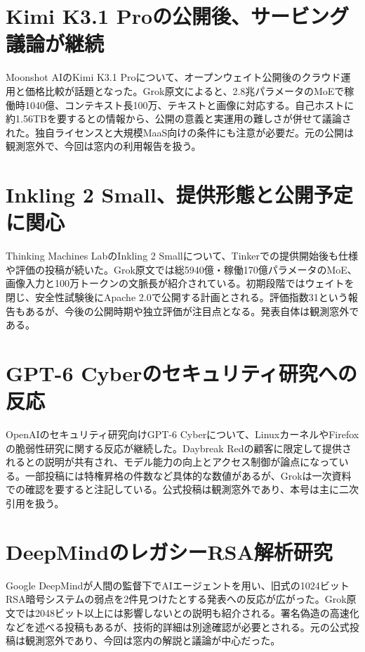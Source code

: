 \section{Kimi K3.1 Proの公開後、サービング議論が継続}
Moonshot AIのKimi K3.1 Proについて、オープンウェイト公開後のクラウド運用と価格比較が話題となった。Grok原文によると、2.8兆パラメータのMoEで稼働時1040億、コンテキスト長100万、テキストと画像に対応する。自己ホストに約1.56TBを要するとの情報から、公開の意義と実運用の難しさが併せて議論された。独自ライセンスと大規模MaaS向けの条件にも注意が必要だ。元の公開は観測窓外で、今回は窓内の利用報告を扱う。

\section{Inkling 2 Small、提供形態と公開予定に関心}
Thinking Machines LabのInkling 2 Smallについて、Tinkerでの提供開始後も仕様や評価の投稿が続いた。Grok原文では総5940億・稼働170億パラメータのMoE、画像入力と100万トークンの文脈長が紹介されている。初期段階ではウェイトを閉じ、安全性試験後にApache 2.0で公開する計画とされる。評価指数31という報告もあるが、今後の公開時期や独立評価が注目点となる。発表自体は観測窓外である。

\section{GPT-6 Cyberのセキュリティ研究への反応}
OpenAIのセキュリティ研究向けGPT-6 Cyberについて、LinuxカーネルやFirefoxの脆弱性研究に関する反応が継続した。Daybreak Redの顧客に限定して提供されるとの説明が共有され、モデル能力の向上とアクセス制御が論点になっている。一部投稿には特権昇格の件数など具体的な数値があるが、Grokは一次資料での確認を要すると注記している。公式投稿は観測窓外であり、本号は主に二次引用を扱う。

\section{DeepMindのレガシーRSA解析研究}
Google DeepMindが人間の監督下でAIエージェントを用い、旧式の1024ビットRSA暗号システムの弱点を2件見つけたとする発表への反応が広がった。Grok原文では2048ビット以上には影響しないとの説明も紹介される。署名偽造の高速化などを述べる投稿もあるが、技術的詳細は別途確認が必要とされる。元の公式投稿は観測窓外であり、今回は窓内の解説と議論が中心だった。

